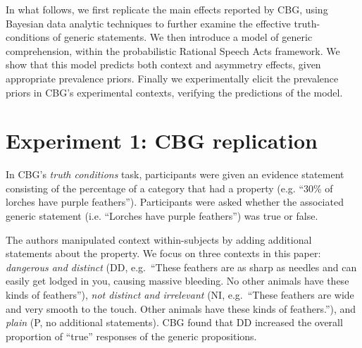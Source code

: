 \documentclass[10pt,letterpaper]{article}
\begin{document}
In what follows, we first replicate the main effects reported by CBG, using Bayesian data analytic techniques to further examine the effective truth-conditions of generic statements. We then introduce a model of generic comprehension, within the probabilistic Rational Speech Acts framework. We show that this model predicts both context and asymmetry effects, given appropriate prevalence priors. Finally we experimentally elicit the prevalence priors in CBG's experimental contexts, verifying the predictions of the model.





\section{Experiment 1: CBG replication}

In CBG's \emph{truth conditions} task, participants were given an evidence statement consisting of the percentage of a category that had a property (e.g. ``30\% of lorches have purple feathers''). Participants were asked whether the associated generic statement (i.e. ``Lorches have purple feathers'') was true or false. 

The authors manipulated context within-subjects by adding additional statements about the property. We focus on three contexts in this paper: \emph{dangerous and distinct} (DD, e.g.~``These feathers are as sharp as needles and can easily get lodged in you, causing massive bleeding. No other animals have these kinds of feathers''), \emph{not distinct and irrelevant} (NI, e.g.~``These feathers are wide and very smooth to the touch. Other animals have these kinds of feathers.''), and \emph{plain} (P, no additional statements). CBG found that DD increased the overall proportion of ``true'' responses of the generic propositions. 
\end{document}
